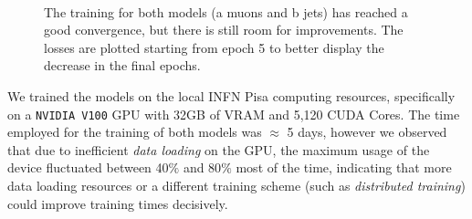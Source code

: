 \begin{figure}
    \myfloatalign
     \\
    \caption[Models losses]{The training for both models (a muons and b jets) has reached a good convergence, but there is still room for improvements. The losses are plotted starting from epoch 5 to better display the decrease in the final epochs.}\label{fig:losses}
    
\end{figure}

We trained the models on the local INFN Pisa computing resources, specifically on a \texttt{NVIDIA V100} GPU with 32GB of VRAM and 5,120 CUDA Cores. The time employed for the training of both models was $\approx$ 5 days, however we observed that due to inefficient \emph{data loading} on the GPU, the maximum usage of the device fluctuated between 40$\%$ and 80$\%$ most of the time, indicating that more data loading resources or a different training scheme (such as \emph{distributed training}) could improve training times decisively.

